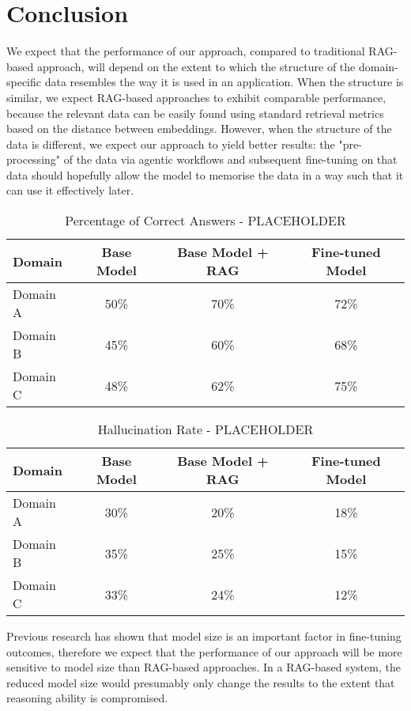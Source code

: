 \section{Conclusion}

We expect that the performance of our approach, compared to traditional
RAG-based approach, will depend on the extent to which the structure of the
domain-specific data resembles the way it is used in an application. When the
structure is similar, we expect RAG-based approaches to exhibit comparable
performance, because the relevant data can be easily found using standard
retrieval metrics based on the distance between embeddings. However, when the
structure of the data is different, we expect our approach to yield better
results: the "pre-processing" of the data via agentic workflows and subsequent
fine-tuning on that data should hopefully allow the model to memorise the data
in a way such that it can use it effectively later.


\begin{table}[ht]
    \centering
    \begin{tabular}{|l|c|c|c|}
        \hline
        \textbf{Domain} & \textbf{Base Model} & \textbf{Base Model + RAG} & \textbf{Fine-tuned Model} \\ \hline
        Domain A & 50\% & 70\% & 72\% \\ \hline
        Domain B & 45\% & 60\% & 68\% \\ \hline
        Domain C & 48\% & 62\% & 75\% \\ \hline
    \end{tabular}
    \caption{Percentage of Correct Answers - PLACEHOLDER}
\end{table}

\begin{table}[ht]
    \centering
    \begin{tabular}{|l|c|c|c|}
        \hline
        \textbf{Domain} & \textbf{Base Model} & \textbf{Base Model + RAG} & \textbf{Fine-tuned Model} \\ \hline
        Domain A & 30\% & 20\% & 18\% \\ \hline
        Domain B & 35\% & 25\% & 15\% \\ \hline
        Domain C & 33\% & 24\% & 12\% \\ \hline
    \end{tabular}
    \caption{Hallucination Rate - PLACEHOLDER}
\end{table}

Previous research \cite{zhang_when_2024} has shown that model size is an
important factor in fine-tuning outcomes, therefore we expect that the
performance of our approach will be more sensitive to model size than RAG-based
approaches. In a RAG-based system, the reduced model size would presumably only
change the results to the extent that reasoning ability is compromised.
